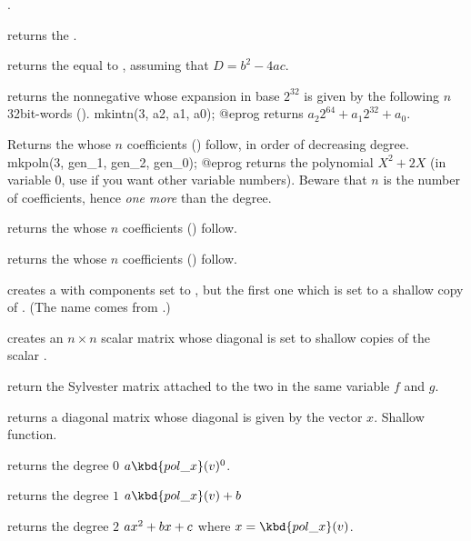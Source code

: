 .

returns the  .

 returns the  equal
to , assuming that $D = b^2 - 4ac$.

\smallskip

 returns the nonnegative  whose
expansion in base $2^{32}$ is given by the following $n$ 32bit-words
().
\bprog
  mkintn(3, a2, a1, a0);
@eprog
\noindent returns $a_2 2^{64} + a_1 2^{32} + a_0$.

 Returns the  whose $n$
coefficients () follow, in order of decreasing degree.
\bprog
  mkpoln(3, gen_1, gen_2, gen_0);
@eprog
\noindent returns the polynomial $X^2 + 2X$ (in variable $0$, use
 if you want other variable numbers). Beware that $n$ is the
number of coefficients, hence \emph{one more} than the degree.

 returns the  whose $n$
coefficients () follow.

 returns the  whose $n$
coefficients () follow.

 creates a  with 
components set to , but the first one which is set to a shallow
copy of . (The name comes from .)

 creates an $n\times n$
scalar matrix whose diagonal is set to shallow copies of the scalar .

 return the Sylvester matrix
attached to the two  in the same variable $f$ and $g$.

 returns a diagonal matrix whose diagonal
is given by the vector $x$. Shallow function.

 returns the degree $0$
 $a \kbd{pol\_x}(v)^0$.

 returns the degree $1$
 $a\kbd{pol\_x}(v) + b$

 returns the degree $2$
 $a\*x^2+b\*x+c$ where $x=\kbd{pol\_x}(v)$.

